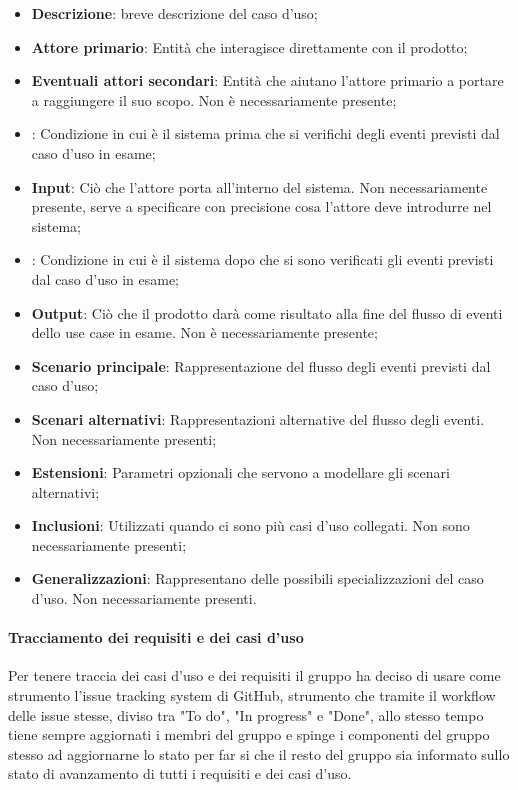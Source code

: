 \documentclass[../norme_di_progetto.tex]{subfiles}
\begin{document}
\begin{itemize}
    \item \textbf{Descrizione}: breve descrizione del caso d'uso;
    \item \textbf{Attore primario}: Entità che interagisce direttamente con il prodotto;
    \item \textbf{Eventuali attori secondari}: Entità che aiutano l'attore primario a portare a raggiungere il suo scopo. Non è necessariamente presente;
    \item {}: Condizione in cui è il sistema prima che si verifichi degli eventi previsti dal caso d'uso in esame;
    \item \textbf{Input}: Ciò che l'attore porta all'interno del sistema. Non necessariamente presente, serve a specificare con precisione cosa l'attore deve introdurre nel sistema;
    \item {}: Condizione in cui è il sistema dopo che si sono verificati gli eventi previsti dal caso d'uso in esame;
    \item \textbf{Output}: Ciò che il prodotto darà come risultato alla fine del flusso di eventi dello use case in esame. Non è necessariamente presente;
    \item \textbf{Scenario principale}: Rappresentazione del flusso degli eventi previsti dal caso d'uso;
    \item \textbf{Scenari alternativi}: Rappresentazioni alternative del flusso degli eventi. Non necessariamente presenti;
    \item \textbf{Estensioni}: Parametri opzionali che servono a modellare gli scenari alternativi;
    \item \textbf{Inclusioni}: Utilizzati quando ci sono più casi d'uso collegati. Non sono necessariamente presenti;
    \item \textbf{Generalizzazioni}: Rappresentano delle possibili specializzazioni del caso d'uso. Non necessariamente presenti.
\end{itemize}


\paragraph{Tracciamento dei requisiti e dei casi d'uso}
Per tenere traccia dei casi d'uso e dei requisiti il gruppo ha deciso di usare come strumento l'issue tracking system di GitHub, strumento che tramite il workflow delle issue stesse, diviso tra "To do", "In progress" e "Done", allo stesso tempo tiene sempre aggiornati i membri del gruppo e spinge i componenti del gruppo stesso ad aggiornarne lo stato per far si che il resto del gruppo sia informato sullo stato di avanzamento di tutti i requisiti e dei casi d'uso.
\end{document}
